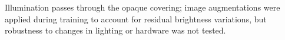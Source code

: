 Illumination passes through the opaque covering; image augmentations were applied during training to account for residual brightness variations, but robustness to changes in lighting or hardware was not tested.
